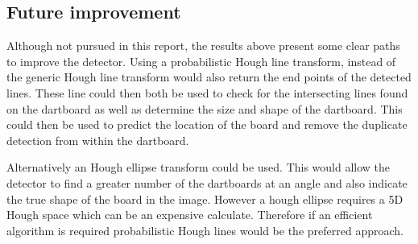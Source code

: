 \documentclass{article}
\begin{document}
\begin{multicols}{2}


\label{fig:examplebadhoughlines}

\subsection{Future improvement}

Although not pursued in this report, the results above present some clear paths to improve the detector. 
Using a probabilistic Hough line transform, instead of the generic Hough line transform would also return the end points of the detected lines. These line could then both be used to check for the intersecting lines found on the dartboard as well as determine the size and shape of the dartboard. This could then be used to predict the location of the board and remove the duplicate detection from within the dartboard.

Alternatively an Hough ellipse transform could be used. This would allow the detector to find a greater number of the dartboards at an angle and also indicate the true shape of the board in the image. However a hough ellipse requires a 5D Hough space which can be an expensive calculate. Therefore if an efficient algorithm is required probabilistic Hough lines would be the preferred approach.

\end{multicols}



\end{document}

